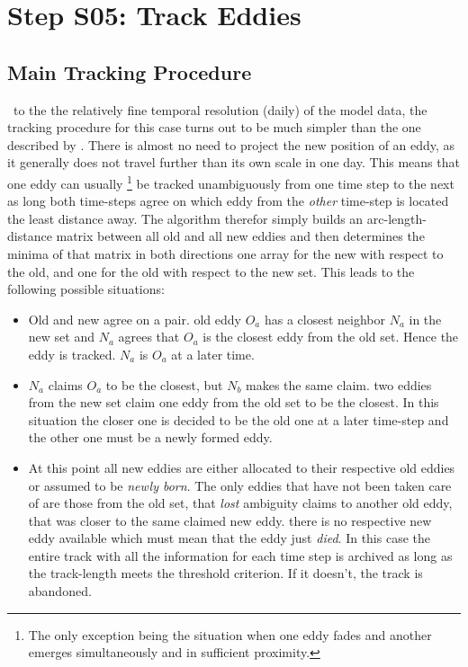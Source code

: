 \section[Tracking]{Step S05: Track Eddies} \label{S:05}
\subsection{Main Tracking Procedure}
~to the the relatively fine temporal resolution (daily) of the model data,
the tracking procedure for this case turns out to be much simpler than the one described by \citet{Chelton2007}. There is almost no need to project the new position of an
eddy, as it generally does not travel further than its own scale in one day.
This means that one eddy can usually \footnote{The only exception being the situation when one eddy fades and  another emerges simultaneously and in sufficient proximity.} be tracked unambiguously from one time step to the
next as long both time-steps agree on which eddy from the \textit{other}
time-step is located the least distance away.
The algorithm therefor simply builds an arc-length-distance matrix
between all old and all new eddies and then determines the minima of that
matrix in both directions \ie one array for the new with respect to the old,
and one for the old with respect to the new set. This leads to the following
possible situations:
\begin{itemize}
\item
	Old and new agree on a pair. \Ie old eddy $O_a$ has a closest neighbor $N_a$ in
the new set and $N_a$ agrees that $O_a$ is the closest eddy from the old
set. Hence the eddy is tracked.  $N_a$ is $O_a$ at a later time.
\item
$N_a$ claims $O_a$ to be the closest, but $N_b$ makes the same claim. \Ie two
eddies from the new set claim one eddy from the old set to be the closest.
In this situation the closer one is decided to be the old one at a later
time-step and the other one must be a newly formed eddy.
\item
At this point all new eddies are either allocated to their respective old
eddies or assumed to be \textit{newly born}. The only eddies that have not been
taken care of are those from the old set, that \textit{lost} ambiguity claims to
another old eddy, that was closer to the same claimed new eddy. \Ie there is no
respective new eddy available which must mean that the eddy just \textit{died}.
In this case the entire track with all the information for each time step is
archived as long as the track-length meets the threshold criterion. If it doesn't,
the track is abandoned.
\end{itemize}
